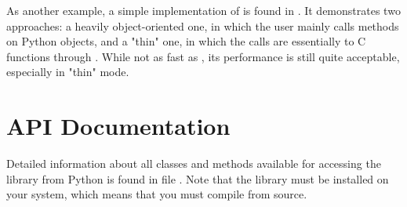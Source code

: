 As another example, a simple implementation of \reroot{} is found in
. It demonstrates two approaches: a heavily
object-oriented one, in which the user mainly calls methods on Python objects,
and a "thin" one, in which the calls are essentially to C functions through
. While not as fast as \reroot{}, its performance is still quite
acceptable, especially in "thin" mode.

\section{API Documentation}

Detailed information about all classes and methods available for accessing the
\nutils{} library from Python is found in file . Note that the library must be installed on your system, which means that you must compile from source.
